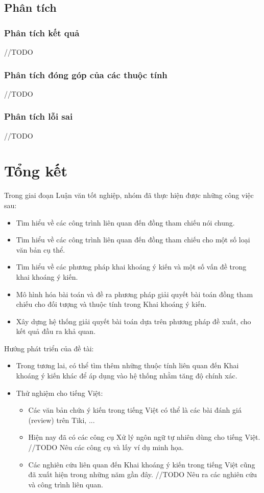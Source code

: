 \documentclass[12pt]{extarticle}
\begin{document}
		\subsection{Phân tích}
			\subsubsection*{Phân tích kết quả}
			//TODO
			\subsubsection*{Phân tích đóng góp của các thuộc tính}
			//TODO
			\subsubsection*{Phân tích lỗi sai}
			//TODO

	\section{Tổng kết}		
		\par Trong giai đoạn Luận văn tốt nghiệp, nhóm đã thực hiện được những công việc sau:
		\begin{itemize}
			\item{Tìm hiểu về các công trình liên quan đến đồng tham chiếu nói chung.}
			\item{Tìm hiểu về các công trình liên quan đến đồng tham chiếu cho một số loại văn bản cụ thể.}
			\item{Tìm hiểu về các phương pháp khai khoáng ý kiến và một số vấn đề trong khai khoáng ý kiến.}
			\item{Mô hình hóa bài toán và đề ra phương pháp giải quyết bài toán đồng tham chiếu cho đối tượng và thuộc tính trong Khai khoáng ý kiến.}
			\item{Xây dựng hệ thống giải quyết bài toán dựa trên phương pháp đề xuất, cho kết quả đầu ra khả quan.}
		\end{itemize}		
		\par Hướng phát triển của đề tài:
		\begin{itemize}
			\item{Trong tương lai, có thể tìm thêm những thuộc tính liên quan đến Khai khoáng ý kiến khác để áp dụng vào hệ thống nhằm tăng độ chính xác.}
			\item{Thử nghiệm cho tiếng Việt:
				\begin{itemize}
					\item{Các văn bản chứa ý kiến trong tiếng Việt có thể là các bài đánh giá (review) trên Tiki, ...
					}
					\item{Hiện nay đã có các công cụ Xử lý ngôn ngữ tự nhiên dùng cho tiếng Việt. //TODO Nêu các công cụ và lấy ví dụ minh họa.}
					\item{Các nghiên cứu liên quan đến Khai khoáng ý kiến trong tiếng Việt cũng đã xuất hiện trong những năm gần đây. //TODO Nêu ra các nghiên cứu và công trình liên quan.}
				\end{itemize}
			}
		\end{itemize}
\end{document}
